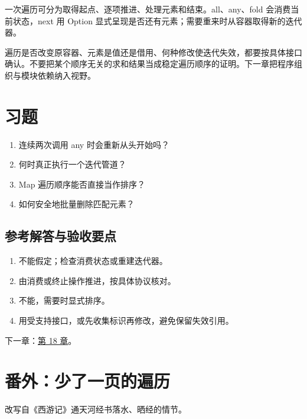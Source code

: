 一次遍历可分为取得起点、逐项推进、处理元素和结束。all、any、fold 会消费当前状态，next 用 Option 显式呈现是否还有元素；需要重来时从容器取得新的迭代器。

遍历是否改变原容器、元素是值还是借用、何种修改使迭代失效，都要按具体接口确认。不要把某个顺序无关的求和结果当成稳定遍历顺序的证明。下一章把程序组织与模块依赖纳入视野。

\section{习题}

\begin{enumerate}

\item 连续两次调用 any 时会重新从头开始吗？

\item 何时真正执行一个迭代管道？

\item Map 遍历顺序能否直接当作排序？

\item 如何安全地批量删除匹配元素？

\end{enumerate}

\subsection*{参考解答与验收要点}

\begin{enumerate}

\item 不能假定；检查消费状态或重建迭代器。

\item 由消费或终止操作推进，按具体协议核对。

\item 不能，需要时显式排序。

\item 用受支持接口，或先收集标识再修改，避免保留失效引用。

\end{enumerate}

下一章：\hyperref[ch:18]{第 18 章}。

\section{番外：少了一页的遍历}

改写自《西游记》通天河经书落水、晒经的情节。


